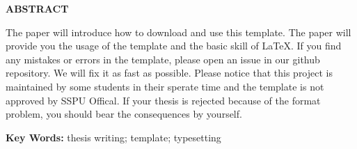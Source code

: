 \begin{center}
    \bfseries
    \TitleEN
\end{center}

\begin{center}
    \bfseries
    ABSTRACT
\end{center}

The paper will introduce how to download and use this template. The paper will provide you the usage of the template and the basic skill of \LaTeX{}. If you find any mistakes or errors in the template, please open an {\ttfamily issue} in our {\ttfamily github} repository. We will fix it as fast as possible. Please notice that this project is maintained by some students in their sperate time and the template is not approved by SSPU Offical. If your thesis is rejected because of the format problem, you should bear the consequences by yourself.

    {\noindent\bfseries Key Words: }thesis writing; template; typesetting
\newpage